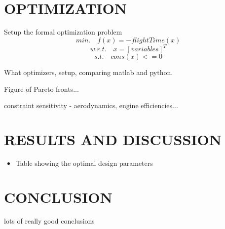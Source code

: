 \documentclass[letterpaper, 10 pt, conference]{ieeeconf}  %
\newcommand{\of}[1]{\ensuremath{\left(#1\right)}}
\begin{document}
\section{OPTIMIZATION}

Setup the formal optimization problem
\begin{equation}
min. \quad f\of{x} = -flightTime\of{x}
\label{eq:objective}
\end{equation}
\begin{equation}
w.r.t. \quad x = [variables]^T
\label{eq:vars}
\end{equation}
\begin{equation}
s.t. \quad cons\of{x} <= 0 
\label{eq:constrants}
\end{equation}

What optimizers, setup, comparing matlab and python. 

Figure of Pareto fronts...

constraint sensitivity - aerodynamics, engine efficiencies...

\section{RESULTS AND DISCUSSION}

\begin{itemize}
	\item{Table showing the optimal design parameters}
\end{itemize}



\section{CONCLUSION}

lots of really good conclusions









\end{document}
